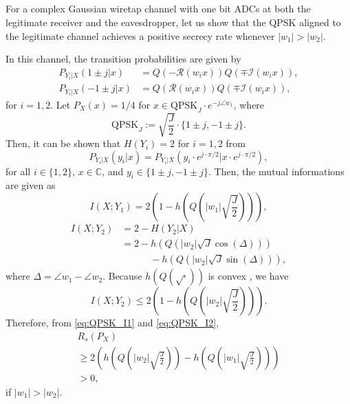 \documentclass[journal]{IEEEtran}
\begin{document}
\begin{appendices}
\section{}
For a complex Gaussian wiretap channel with one bit ADCs at both the legitimate receiver and the eavesdropper, let us show that the QPSK aligned to the legitimate channel achieves a positive secrecy rate whenever $|w_1|>|w_2|$. 

In this channel, the transition probabilities are given by
\begin{align}
     P_{Y_i|X}( 1 \pm j|x) &= Q(- \mathcal{R}(w_i x))Q(\mp \mathcal{I}(w_i x)),
    \\ P_{Y_i|X}(- 1 \pm j|x) &= Q( \mathcal{R}(w_i x))Q(\mp \mathcal{I}(w_i x)),
\end{align}
for $i=1,2$.
Let $P_X(x) = 1/4$ for $x\in \mathrm{QPSK}_J \cdot e^{-j \angle w_1}$, where
\begin{equation}
    \mathrm{QPSK}_J := \sqrt{\frac{J}{2}} \cdot \{1\pm j, -1 \pm j\}.
\end{equation}
Then, it can be shown that $H(Y_i)=2$ for $i=1,2$ from
\begin{equation}
    P_{Y_i|X}(y_i|x) = P_{Y_i|X}(y_i\cdot e^{j\cdot \pi/2}|x\cdot e^{j\cdot \pi/2}),
\end{equation}
for all $i\in\{1,2\}$, $x\in \mathbb{C}$, and $y_i \in \{1 \pm j, - 1 \pm j\}$.
Then, the mutual informations are given as
\begin{equation}
    I(X;Y_1) = 2\left( 1-h\left( Q\left( |w_1|\sqrt{\frac{J}{2}} \right) \right) \right), \label{eq:QPSK_I1}
\end{equation}
\begin{align}
    I(X;Y_2) &= 2-H(Y_2|X)
    \\& = 2-h\left( Q\left( |w_2| \sqrt{J} \cos(\Delta) \right)\right)
    \\& \quad\quad\quad - h\left( Q\left( |w_2|\sqrt{J}  \sin(\Delta) \right)\right), \nonumber
\end{align}
where $\Delta = \angle w_1 - \angle w_2$.
Because $h\left( Q\left(\sqrt{\cdot} \right) \right)$ is convex \cite{hqsqrt}, we have
\begin{equation}
    I(X;Y_2) \leq  2\left(1- h\left( Q\left( |w_2|\sqrt{\frac{J}{2}} \right) \right) \right). \label{eq:QPSK_I2}
\end{equation}
Therefore, from \eqref{eq:QPSK_I1} and \eqref{eq:QPSK_I2},
\begin{multline}
    R_s(P_X) \\ \geq  2\left( h\left( Q\left( |w_2|\sqrt{\frac{J}{2}} \right) \right) -h\left( Q\left( |w_1|\sqrt{\frac{J}{2}} \right) \right) \right) \\ >0,
\end{multline}
if $|w_1|>|w_2|$.
\end{appendices}







\end{document}
